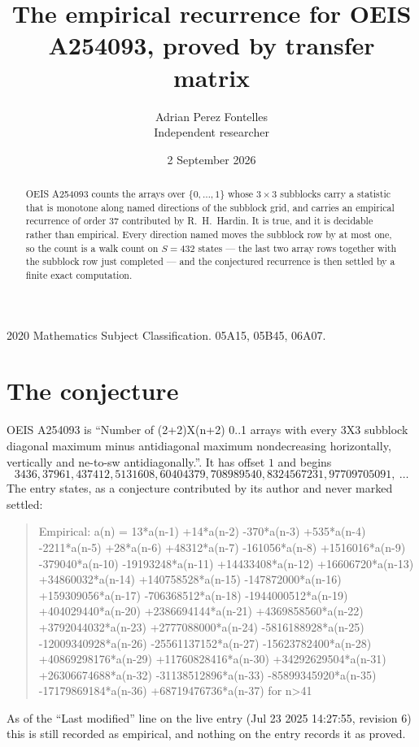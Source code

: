 \documentclass[11pt,a4paper]{article}
\title{The empirical recurrence for OEIS A254093, proved by transfer matrix}
\author{Adrian Perez Fontelles\\ \small Independent researcher}
\date{2 September 2026}
\theoremstyle{plain}
\theoremstyle{definition}
\begin{document}
\maketitle

\begin{abstract}
OEIS A254093 counts the arrays over $\{0,\dots,1\}$ whose $3\times3$ subblocks carry a
statistic that is monotone along named directions of the subblock grid, and carries an
empirical recurrence of order $37$ contributed by R.~H.~Hardin. It is true, and it is
decidable rather than empirical. Every direction named moves the subblock row by at most one,
so the count is a walk count on $S=432$ states --- the last two array rows together with the
subblock row just completed --- and the conjectured recurrence is then settled by a finite
exact computation.
\end{abstract}

\noindent\small 2020 Mathematics Subject Classification. 05A15, 05B45, 06A07.\normalsize

\section{The conjecture}

OEIS A254093 is ``Number of (2+2)X(n+2) 0..1 arrays with every 3X3 subblock diagonal maximum minus antidiagonal maximum nondecreasing horizontally, vertically and ne-to-sw antidiagonally.''. It has offset $1$ and begins
\[
3436, 37961, 437412, 5131608, 60404379, 708989540, 8324567231, 97709705091,\ \dots
\]
The entry states, as a conjecture contributed by its author and never marked settled:
\begin{quote}
Empirical: a(n) = 13*a(n-1) +14*a(n-2) -370*a(n-3) +535*a(n-4) -2211*a(n-5) +28*a(n-6) +48312*a(n-7) -161056*a(n-8) +1516016*a(n-9) -379040*a(n-10) -19193248*a(n-11) +14433408*a(n-12) +16606720*a(n-13) +34860032*a(n-14) +140758528*a(n-15) -147872000*a(n-16) +159309056*a(n-17) -706368512*a(n-18) -1944000512*a(n-19) +404029440*a(n-20) +2386694144*a(n-21) +4369858560*a(n-22) +3792044032*a(n-23) +2777088000*a(n-24) -5816188928*a(n-25) -12009340928*a(n-26) -25561137152*a(n-27) -15623782400*a(n-28) +40869298176*a(n-29) +11760828416*a(n-30) +34292629504*a(n-31) +26306674688*a(n-32) -31138512896*a(n-33) -85899345920*a(n-35) -17179869184*a(n-36) +68719476736*a(n-37) for n>41
\end{quote}
As of the ``Last modified'' line on the live entry (Jul 23 2025 14:27:55, revision 6) this is still
recorded as empirical, and nothing on the entry records it as proved.
\end{document}
